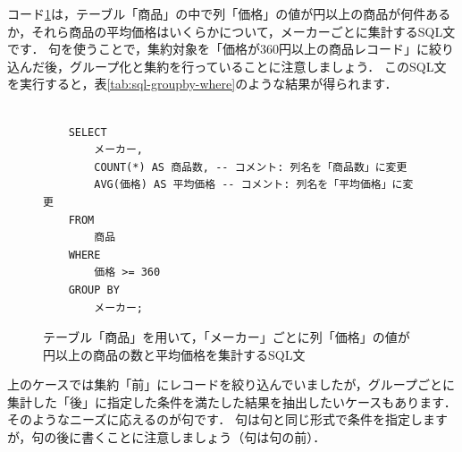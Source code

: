 コード\ref{code:sql-groupby-where}は，テーブル「商品」の中で列「価格」の値が円以上の商品が何件あるか，それら商品の平均価格はいくらかについて，メーカーごとに集計するSQL文です．
句を使うことで，集約対象を「価格が360円以上の商品レコード」に絞り込んだ後，グループ化と集約を行っていることに注意しましょう．
このSQL文を実行すると，表\ref{tab:sql-groupby-where}のような結果が得られます．
\begin{figure}[!htbp]
    \begin{verbatim}

    SELECT
        メーカー,
        COUNT(*) AS 商品数, -- コメント: 列名を「商品数」に変更
        AVG(価格) AS 平均価格 -- コメント: 列名を「平均価格」に変更
    FROM
        商品
    WHERE
        価格 >= 360
    GROUP BY
        メーカー;

    \end{verbatim}
    \captionsetup{name=コード}
    \caption{テーブル「商品」を用いて，「メーカー」ごとに列「価格」の値が円以上の商品の数と平均価格を集計するSQL文}
    \label{code:sql-groupby-where}
\end{figure}
\begin{table}[!htbp]
    \centering
    \caption{テーブル「商品」を用いて，「メーカー」ごとに列「価格」の値が円以上の商品の数と平均価格を集計した結果}
    \label{tab:sql-groupby-where}
\end{table}

上のケースでは集約「前」にレコードを絞り込んでいましたが，グループごとに集計した「後」に指定した条件を満たした結果を抽出したいケースもあります．
そのようなニーズに応えるのが句です．
句は句と同じ形式で条件を指定しますが，句の後に書くことに注意しましょう（句は句の前）．

